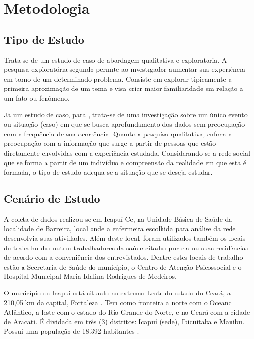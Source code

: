 \chapter{Metodologia}
\label{chap:metodologia}

\section{Tipo de Estudo}
Trata-se de um estudo de caso de abordagem qualitativa e exploratória. A pesquisa exploratória segundo \cite{leopardi2001metodologia} permite ao investigador aumentar sua experiência em torno de um determinado problema. Consiste em explorar tipicamente a primeira aproximação de um tema e visa criar maior familiaridade em relação a um fato ou fenômeno. 

Já um estudo de caso, para \cite{leopardi2001metodologia}, trata-se de uma investigação sobre um único evento ou situação (caso) em que se busca aprofundamento dos dados  sem preocupação com a frequência de sua ocorrência. Quanto a pesquisa qualitativa, \cite{leopardi2001metodologia} enfoca a preocupação com a informação que surge a partir de pessoas que estão diretamente envolvidas com a experiência estudada. Considerando-se a rede social que se forma a partir de um indivíduo e compreensão da realidade em que esta é formada, o tipo de estudo adequa-se a situação que se deseja estudar.

\section{Cenário de Estudo}
A coleta de dados realizou-se em Icapuí-Ce, na Unidade Básica de Saúde da localidade de Barreira, local onde a enfermeira escolhida para análise da rede desenvolvia suas atividades. Além deste local, foram utilizados também os locais de trabalho dos outros trabalhadores da saúde citados por ela ou suas residências de acordo com a conveniência dos entrevistados. Dentre estes locais de trabalho estão a Secretaria de Saúde do município, o Centro de Atenção Psicossocial e o Hospital Municipal Maria Idalina Rodrigues de Medeiros. 

O município de Icapuí está situado no extremo Leste do estado do Ceará, a 210,05 km da capital, Fortaleza \cite{der}. Tem como fronteira a norte com o Oceano Atlântico, a leste com o estado do Rio Grande do Norte, e no Ceará com a cidade de Aracati. É dividada em três (3) distritos: Icapuí (sede), Ibicuitaba e Manibu. Possui uma população de 18.392 habitantes \cite{censo2010disponivel}.
  

